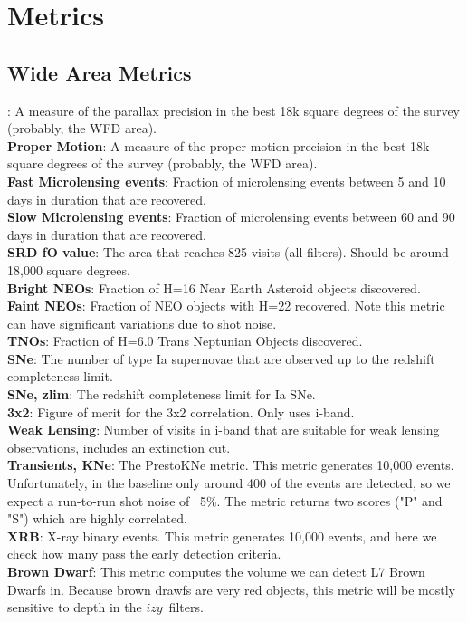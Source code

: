 \section{Metrics}



\subsection{Wide Area Metrics}

: A measure of the parallax precision in the best 18k square degrees of the survey (probably, the WFD area).  \\
{\bf Proper Motion}: A measure of the proper motion precision in the best 18k square degrees of the survey (probably, the WFD area). \\
{\bf Fast Microlensing events}: Fraction of microlensing events between 5 and 10 days in duration that are recovered. \\
{\bf Slow Microlensing events}: Fraction of microlensing events between 60 and 90 days in duration that are recovered.\\
{\bf SRD fO value}: The area that reaches 825 visits (all filters). Should be around 18,000 square degrees. \\
{\bf Bright NEOs}: Fraction of H=16 Near Earth Asteroid objects discovered. \\
{\bf Faint NEOs}: Fraction of NEO objects with H=22 recovered. Note this metric can have significant variations due to shot noise.\\
{\bf TNOs}: Fraction of H=6.0 Trans Neptunian Objects discovered.  \\
{\bf SNe}: The number of type Ia supernovae that are observed up to the redshift completeness limit. \\
{\bf SNe, zlim}: The redshift completeness limit for Ia SNe. \\
{\bf 3x2}: Figure of merit for the 3x2 correlation. Only uses i-band. \\
{\bf Weak Lensing}: Number of visits in i-band that are suitable for weak lensing observations, includes an extinction cut. \\
{\bf Transients, KNe}: The PrestoKNe metric. This metric generates 10,000 events. Unfortunately, in the baseline only around 400 of the events are detected, so we expect a run-to-run shot noise of ~5\%. The metric returns two scores ("P" and "S") which are highly correlated.  \\
{\bf XRB}: X-ray binary events. This metric generates 10,000 events, and here we check how many pass the early detection criteria. \\
{\bf Brown Dwarf}:  This metric computes the volume we can detect L7 Brown Dwarfs in. Because brown drawfs are very red objects, this metric will be mostly sensitive to depth in the $izy$\ filters.\\

